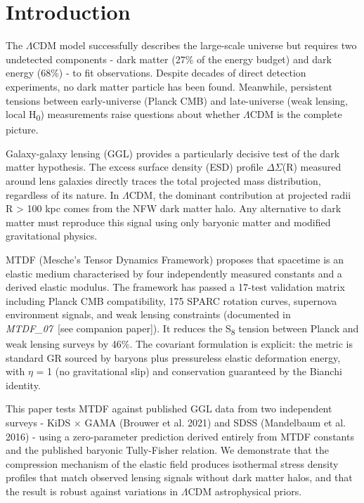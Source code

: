 \documentclass[11pt,a4paper]{article}
\begin{document}
\section{Introduction}
\label{sec:intro}
The $\Lambda$CDM model successfully describes the large-scale universe but requires two undetected components  -  dark matter (27\% of the energy budget) and dark energy (68\%)  -  to fit observations. Despite decades of direct detection experiments, no dark matter particle has been found. Meanwhile, persistent tensions between early-universe (Planck CMB) and late-universe (weak lensing, local H\textsubscript{0}) measurements raise questions about whether $\Lambda$CDM is the complete picture.

Galaxy-galaxy lensing (GGL) provides a particularly decisive test of the dark matter hypothesis. The excess surface density (ESD) profile $\Delta$$\Sigma$(R) measured around lens galaxies directly traces the total projected mass distribution, regardless of its nature. In $\Lambda$CDM, the dominant contribution at projected radii R > 100 kpc comes from the NFW dark matter halo. Any alternative to dark matter must reproduce this signal using only baryonic matter and modified gravitational physics.

MTDF (Mesche's Tensor Dynamics Framework) proposes that spacetime is an elastic medium characterised by four independently measured constants and a derived elastic modulus. The framework has passed a 17-test validation matrix including Planck CMB compatibility, 175 SPARC rotation curves, supernova environment signals, and weak lensing constraints (documented in \textit{MTDF\_\allowbreak{}07}~[see companion paper]). It reduces the S\textsubscript{8} tension between Planck and weak lensing surveys by 46\%. The covariant formulation is explicit: the metric is standard GR sourced by baryons plus pressureless elastic deformation energy, with $\eta$ = 1 (no gravitational slip) and conservation guaranteed by the Bianchi identity.

This paper tests MTDF against published GGL data from two independent surveys  -  KiDS $\times$ GAMA (Brouwer et al. 2021) and SDSS (Mandelbaum et al. 2016)  -  using a zero-parameter prediction derived entirely from MTDF constants and the published baryonic Tully-Fisher relation. We demonstrate that the compression mechanism of the elastic field produces isothermal stress density profiles that match observed lensing signals without dark matter halos, and that the result is robust against variations in $\Lambda$CDM astrophysical priors.
\end{document}
